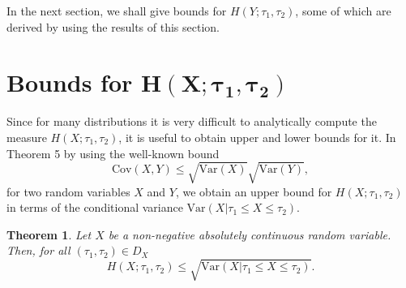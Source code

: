 \documentclass[11pt]{article}
\newtheorem{theorem}{Theorem}
\begin{document}
In the next section, we shall give bounds for $H(Y;\tau_1,\tau_2)$, some of which are derived by using the results of this section.

\section{Bounds for $\boldsymbol{H(X;\tau_1,\tau_2)}$} \label{sec4}

Since for many distributions it is very difficult to analytically compute the measure $H(X;\tau_1,\tau_2 )$, it is useful to obtain upper and lower bounds for it. In Theorem 5 by using the well-known bound
\begin{equation*} \textstyle
	\mathrm{Cov}(X,Y)\leq\sqrt{\mathrm{Var}(X)} \sqrt{\mathrm{Var}(Y)},
\end{equation*}
for two random variables $X$ and $Y$, we obtain an upper bound for $H(X;\tau_1,\tau_2 )$ in terms of the conditional variance $\mathrm{Var}(X|\tau_1 \leq X\leq \tau_2)$.

 
\begin{theorem} 
	Let $X$ be a non-negative absolutely continuous random variable. Then, for all $(\tau_1,\tau_2)\in D_X$
	\begin{equation} \textstyle
		H(X;\tau_1,\tau_2 )\leq\sqrt{\mathrm{Var}(X|\tau_1 \leq X\leq \tau_2)}.
	\end{equation}
\end{theorem}
\end{document}
